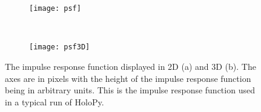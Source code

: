 %


    \begin{figure}[htbp!]
        \begin{center}
        \begin{subfigure}[t]{\textwidth}
            \texttt{[image: psf]}
            \caption{}
            \label{fig:psf}
        \end{subfigure}
        \\
        \begin{subfigure}[t]{0.4\textwidth}
            \texttt{[image: psf3D]}
            \caption{}
            \label{fig:psf3D}
        \end{subfigure}
        \end{center}
        \caption{The impulse response function displayed in 2D (a) and 3D (b).
        The axes are in pixels with the height of the impulse response function
    being in arbitrary units. This is the impulse response function used in a
typical run of HoloPy.}
        \label{fig:pointSpreadFunction}
    \end{figure}







%
%
% 
